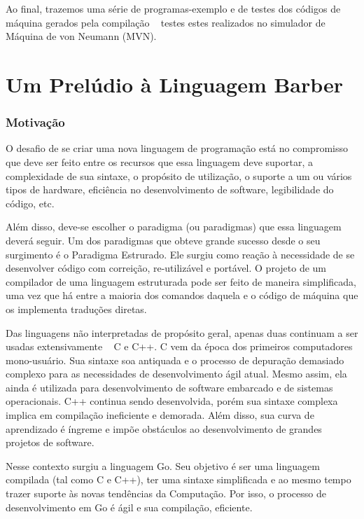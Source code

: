 \documentclass[a4paper,12pt]{report}
\begin{document}
    Ao final, trazemos uma série de programas-exemplo e de testes dos códigos de máquina gerados pela compilação \textemdash ~ testes estes realizados no simulador de Máquina de von Neumann (MVN).
    
    \part*{Um Prelúdio à Linguagem Barber}

    \section*{Motivação}
    O desafio de se criar uma nova linguagem de programação está no compromisso que deve ser feito entre os recursos que essa linguagem deve suportar, a complexidade de sua sintaxe, o propósito de utilização, o suporte a um ou vários tipos de hardware, eficiência no desenvolvimento de software, legibilidade do código, etc.

    Além disso, deve-se escolher o paradigma (ou paradigmas) que essa linguagem deverá seguir. Um dos paradigmas que obteve grande sucesso desde o seu surgimento é o Paradigma Estrurado. Ele surgiu como reação à necessidade de se desenvolver código com correição, re-utilizável e portável. O projeto de um compilador de uma linguagem estruturada pode ser feito de maneira simplificada, uma vez que há entre a maioria dos comandos daquela e o código de máquina que os implementa traduções diretas.  

    Das linguagens não interpretadas de propósito geral, apenas duas continuam a ser usadas extensivamente \textemdash ~ C e C++. C vem da época dos primeiros computadores mono-usuário. Sua sintaxe soa antiquada e o processo de depuração demasiado complexo para as necessidades de desenvolvimento ágil atual. Mesmo assim, ela ainda é utilizada para desenvolvimento de software embarcado e de sistemas operacionais. C++ continua sendo desenvolvida, porém sua sintaxe complexa implica em compilação ineficiente e demorada. Além disso, sua curva de aprendizado é íngreme e impõe obstáculos ao desenvolvimento de grandes projetos de software.

    Nesse contexto surgiu a linguagem Go. Seu objetivo é ser uma linguagem compilada (tal como C e C++), ter uma sintaxe simplificada e ao mesmo tempo trazer suporte às novas tendências da Computação. Por isso, o processo de desenvolvimento em Go é ágil e sua compilação, eficiente.
\end{document}
